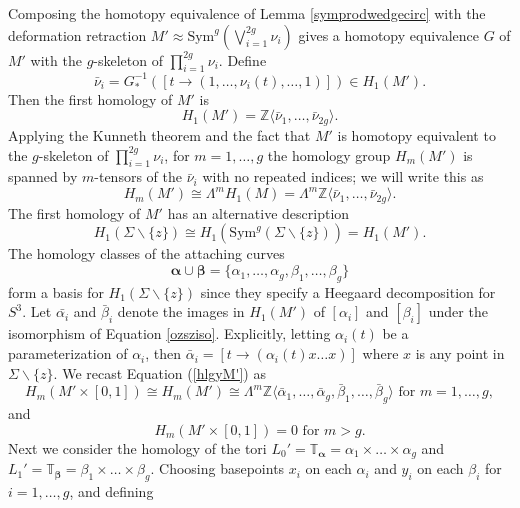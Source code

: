 \documentclass[11pt]{amsart}
\theoremstyle{definition}
\theoremstyle{remark}
\def\Z{\mathbb{Z}}
\def\Sym{\mathrm{Sym}}
\numberwithin{equation}{section}
\begin{document}
Composing the homotopy equivalence of Lemma \ref{symprodwedgecirc} with the deformation retraction $M'\approx\Sym^g(\bigvee_{i=1}^{2g}\nu_i)$ gives a homotopy equivalence $G$ of $M'$ with the $g$-skeleton of $\prod_{i=1}^{2g} \nu_i$. Define
\[\bar{\nu}_i=G_*^{-1}([t\to (1,\hdots, \nu_i(t),\hdots,1)])\in H_1(M').\]
Then the first homology of $M'$ is 
\begin{equation}
H_1(M')=\Z\langle \bar{\nu}_1,\hdots ,\bar{\nu}_{2g}\rangle.
\end{equation}
Applying the Kunneth theorem and the fact that $M'$ is homotopy equivalent to the $g$-skeleton of $\prod_{i=1}^{2g} \nu_i$, for $m=1,\hdots ,g$ the homology group $H_m(M')$ is spanned by $m$-tensors of the $\bar{\nu}_i$ with no repeated indices; we will write this as \begin{equation}\label{hlgyM'}
    H_m(M')\cong \Lambda^m H_1(M)=\Lambda^m \Z\langle\bar{\nu}_1,\hdots ,\bar{\nu}_{2g}\rangle.
\end{equation}
The first homology of $M'$ has an alternative description \cite[~Lemma 2.6]{OS3manifolds1}
\begin{equation}\label{ozsziso}H_1(\Sigma\backslash\{z\})\cong H_1(\Sym^g(\Sigma\backslash\{z\})) =H_1(M').\end{equation}
The homology classes of the attaching curves \[\bm{\alpha}\cup\bm{\beta}=\{\alpha_1,\hdots ,\alpha_g,\beta_1,\hdots ,\beta_g\}\] form a basis for $H_1(\Sigma\backslash\{z\})$ since they specify a Heegaard decomposition for $S^3$. Let $\bar{\alpha_i}$ and $\bar{\beta}_i$ denote the images in $H_1(M')$ of $[\alpha_i]$ and $[\beta_i]$ under the isomorphism of Equation \ref{ozsziso}. Explicitly, letting $\alpha_i(t)$ be a parameterization of $\alpha_i$, then $\bar{\alpha}_i=[t\to (\alpha_i(t)x\hdots x)]$ where $x$ is any point in $\Sigma\backslash\{z\}$. We recast Equation (\ref{hlgyM'}) as 
\begin{equation}
H_m(M'\times[0,1])\cong H_m(M')\cong\Lambda^m \Z\langle \bar{\alpha}_1,\hdots ,\bar{\alpha}_g, \bar{\beta}_1,\hdots ,\bar{\beta}_g\rangle\textrm{ for } m=1,\hdots, g,
\end{equation}
and
\begin{equation}H_m(M'\times [0,1])=0\textrm{ for } m>g.\end{equation}
Next we consider the homology of the tori $L_0'=\mathbb{T}_{\bm{\alpha}}=\alpha_1\times\hdots\times\alpha_g$ and $L_1'=\mathbb{T}_{\bm{\beta}}=\beta_1\times\hdots\times\beta_g$. Choosing basepoints $x_i$ on each $\alpha_i$ and $y_i$ on each $\beta_i$ for $i=1,\hdots ,g$, and defining
\end{document}
